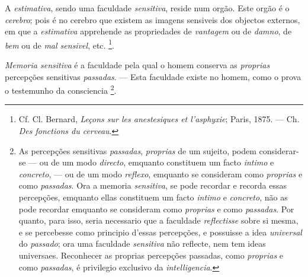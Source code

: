 
A \emph{estimativa}, sendo uma faculdade \emph{sensitiva}, reside num orgão. Este orgão é o \emph{cerebro}; pois é no cerebro que existem as imagens sensiveis dos objectos   externos, em que a \emph{estimativa} apprehende as propriedades de \emph{vantagem} ou de \emph{damno}, de \emph{bem} ou de \emph{mal sensivel}, etc. \footnote{Cf. Cl. Bernard, \emph{Leçons sur les anestesiques et l'asphyxie}; Paris, 1875. --- Ch. \emph{Des fonctions du cerveau}.}.


\emph{Memoria sensitiva} é a faculdade pela qual o homem conserva as \emph{proprias} percepções sensitivas \emph{passadas}. --- Esta faculdade existe no homem, como o prova o testemunho da consciencia \footnote{As percepções sensitivas \emph{passadas}, \emph{proprias} de um sujeito, podem considerar-se --- ou de um modo \emph{directo}, emquanto constituem um facto \emph{intimo} e \emph{concreto}, --- ou de um modo \emph{reflexo}, emquanto se consideram como \emph{proprias} e como \emph{passadas}. Ora a memoria \emph{sensitiva}, se pode recordar e recorda essas percepções, emquanto ellas constituem um facto \emph{intimo} e \emph{concreto}, não as pode recordar emquanto se consideram como \emph{proprias} e como \emph{passadas}. Por quanto, para isso, seria necessario que a faculdade \emph{reflectisse} sobre si mesma, e se percebesse como principio d'essas percepções, e possuisse a idea \emph{universal} do \emph{passado}; ora uma faculdade \emph{sensitiva} não reflecte, nem tem ideas universaes. Reconhecer as proprias percepções passadas, como \emph{proprias} e como \emph{passadas}, é privilegio exclusivo da \emph{intelligencia}.}.


